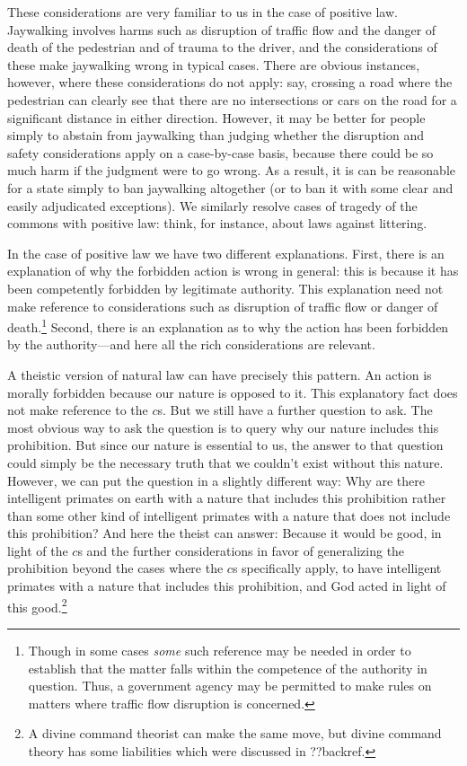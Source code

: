 These considerations are very familiar to us in the case of positive law. Jaywalking involves harms such as
disruption of traffic flow and the danger of death of the pedestrian and of trauma to the driver, and the
considerations of these make jaywalking wrong in typical cases. There are 
obvious instances, however, where these considerations do not apply: say, crossing a road where the pedestrian
can clearly see that there are no intersections or cars on the road for a significant distance in either 
direction. However, it may be better for people simply to abstain from jaywalking than judging whether the 
disruption and safety considerations apply on a case-by-case basis, because there could be so much harm if 
the judgment were to go wrong. As a result, it is can be reasonable for a state simply to ban jaywalking
altogether (or to ban it with some clear and easily adjudicated exceptions). We similarly resolve cases of
tragedy of the commons with positive law: think, for instance, about laws against littering.

In the case of positive law we have two different explanations. First, there is an explanation of why
the forbidden action is wrong in general: this is because it has been competently forbidden by legitimate authority.
This explanation need not make reference to considerations such as disruption of traffic flow or danger
of death.\footnote{Though in some cases \textit{some} such reference may be needed in order to establish
that the matter falls within the competence of the authority in question. Thus, a government agency may
be permitted to make rules on matters where traffic flow disruption is concerned.} Second, there is an 
explanation as to why the action has been forbidden by the authority---and here all the rich considerations
are relevant.

A theistic version of natural law can have precisely this pattern. An action is morally forbidden because
our nature is opposed to it. This explanatory fact does not make reference to the $c$s. But we still
have a further question to ask. The most obvious way to ask the question is to query why our nature 
includes this prohibition. But since our nature is essential to us, the answer to that question could 
simply be the necessary truth that we couldn't exist without this nature. However, we can put the question
in a slightly different way: Why are there intelligent primates on earth with a nature that includes this prohibition
rather than some other kind of intelligent primates with a nature that does not include this prohibition?
And here the theist can answer: Because it would be good, in light of the $c$s and the
further considerations in favor of generalizing the prohibition beyond the cases where the $c$s specifically
apply, to have intelligent primates with a nature that includes this prohibition, and God acted in light
of this good.\footnote{A divine command theorist can make the same move, but divine command theory has some
liabilities which were discussed in ??backref.}

